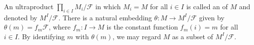 An ultraproduct $\prod_{i \in I} M_i / \mathcal{F}$ in which $M_i = M$ for all $i \in I$ is called an  of $M$ and denoted by $M^I / \mathcal{F}$. There is a natural embedding $\theta: M \rightarrow M^I / \mathcal{F}$ given by $\theta(m) = f_m \mathcal{F}$, where $f_m: I \rightarrow M$ is the constant function $f_m(i) = m$ for all $i \in I$. By identifying $m$ with $\theta(m)$, we may regard $M$ as a subset of $M^I / \mathcal{F}$.

